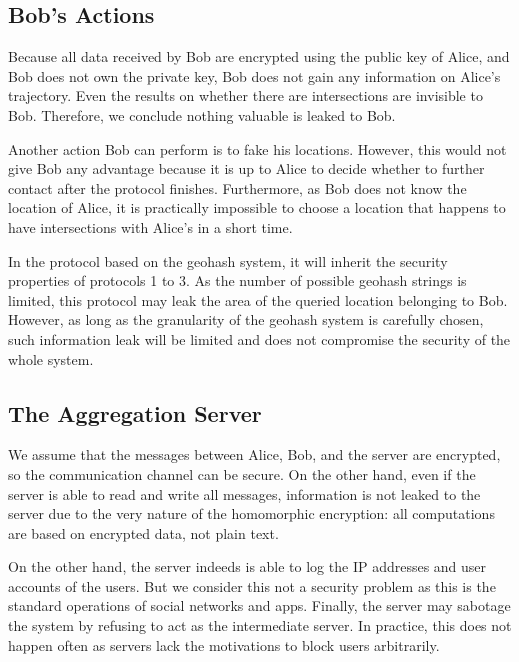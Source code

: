 \subsection{Bob's Actions}

Because all data received by Bob are encrypted using the public key of Alice, and Bob does not own the private key, Bob does not gain any information on Alice's trajectory. Even the results on whether there are intersections are invisible to Bob. Therefore, we conclude nothing valuable is leaked to Bob.

Another action Bob can perform is to fake his locations. However, this would not give Bob any advantage because it is up to Alice to decide whether to further contact after the protocol finishes. Furthermore, as Bob does not know the location of Alice, it is practically impossible to choose a location that happens to have intersections with Alice's in a short time. 

In the protocol based on the geohash system, it will inherit the security properties of protocols 1 to 3. As the number of possible geohash strings is limited, this protocol may leak the area of the queried location belonging to Bob. However, as long as the granularity of the geohash system is carefully chosen, such information leak will be limited and does not compromise the security of the whole system.

\subsection{The Aggregation Server}

We assume that the messages between Alice, Bob, and the server are encrypted, so the communication channel can be secure. On the other hand, even if the server is able to read and write all messages, information is not leaked to the server due to the very nature of the homomorphic encryption: all computations are based on encrypted data, not plain text. 

On the other hand, the server indeeds is able to log the IP addresses and user accounts of the users. But we consider this not a security problem as this is the standard operations of social networks and apps. Finally, the server may sabotage the system by refusing to act as the intermediate server. In practice, this does not happen often as servers lack the motivations to block users arbitrarily. 
 